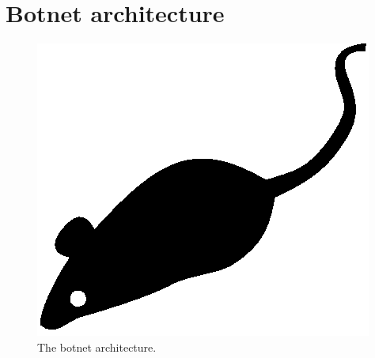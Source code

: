 \section{Botnet architecture}
\label{sec:botnet-architecture}

\lipsum[1]

\begin{figure}[tp]
	\centering
	\includegraphics{./fig/acmlarge-mouse}
	\caption{The botnet architecture.}
		\label{fig:botnet-architecture}
\end{figure}

\lipsum[1]

\lipsum[1]
